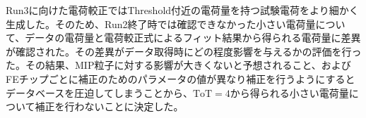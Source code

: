 Run3に向けた電荷較正ではThreshold付近の電荷量を持つ試験電荷をより細かく生成した。そのため、Run2終了時では確認できなかった小さい電荷量について、データの電荷量と電荷較正式によるフィット結果から得られる電荷量に差異が確認された。その差異がデータ取得時にどの程度影響を与えるかの評価を行った。その結果、MIP粒子に対する影響が大きくないと予想されること、およびFEチップごとに補正のためのパラメータの値が異なり補正を行うようにするとデータベースを圧迫してしまうことから、$\mathrm{ToT}=4$から得られる小さい電荷量について補正を行わないことに決定した。




\newpage
